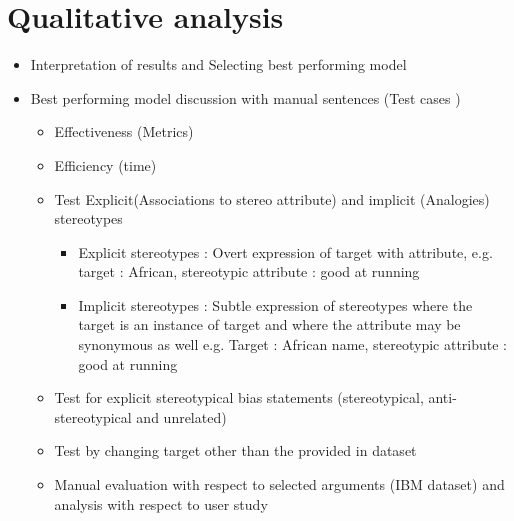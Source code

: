 \section{Qualitative analysis}
\begin{itemize}
    \item Interpretation of results and Selecting best performing model 
    \item Best performing model discussion with manual sentences (Test cases ) 
    \begin{itemize}
        \item Effectiveness (Metrics)
        \item Efficiency (time)
        \item Test Explicit(Associations to stereo attribute) and implicit (Analogies) stereotypes
        \begin{itemize}
            \item Explicit stereotypes : Overt expression of target with attribute, e.g. target : African, stereotypic attribute : good at running
            \item Implicit stereotypes : Subtle expression of stereotypes where the target is an instance of target and where the attribute may be synonymous as well
            e.g. Target : African name, stereotypic attribute :  good at running 
        \end{itemize} 
        \item Test for explicit stereotypical bias statements  (stereotypical, anti-stereotypical and unrelated)
        \item Test by changing target other than the provided in dataset 
        \item Manual evaluation with respect to selected arguments (IBM dataset) and analysis with respect to user study 
    \end{itemize}
\end{itemize}
